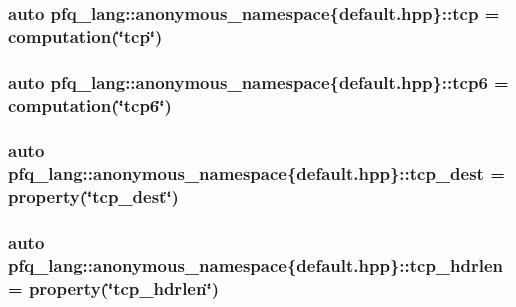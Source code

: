 \hypertarget{namespacepfq__lang_1_1anonymous__namespace_02default_8hpp_03_a4046140746c0012b4d1ea8d3ef53f084}{
\subsubsection[{tcp}]{\setlength{\rightskip}{0pt plus 5cm}auto pfq\-\_\-lang\-::anonymous\-\_\-namespace\{default.\-hpp\}\-::tcp = {\bf computation}(\char`\"{}tcp\char`\"{})}}\label{namespacepfq__lang_1_1anonymous__namespace_02default_8hpp_03_a4046140746c0012b4d1ea8d3ef53f084}
\hypertarget{namespacepfq__lang_1_1anonymous__namespace_02default_8hpp_03_a734af11014e5ccaef77d6fa39cea0d6b}{
\subsubsection[{tcp6}]{\setlength{\rightskip}{0pt plus 5cm}auto pfq\-\_\-lang\-::anonymous\-\_\-namespace\{default.\-hpp\}\-::tcp6 = {\bf computation}(\char`\"{}tcp6\char`\"{})}}\label{namespacepfq__lang_1_1anonymous__namespace_02default_8hpp_03_a734af11014e5ccaef77d6fa39cea0d6b}
\hypertarget{namespacepfq__lang_1_1anonymous__namespace_02default_8hpp_03_a3123415d88452c599055bf8eaba2211e}{
\subsubsection[{tcp\-\_\-dest}]{\setlength{\rightskip}{0pt plus 5cm}auto pfq\-\_\-lang\-::anonymous\-\_\-namespace\{default.\-hpp\}\-::tcp\-\_\-dest = {\bf property}(\char`\"{}tcp\-\_\-dest\char`\"{})}}\label{namespacepfq__lang_1_1anonymous__namespace_02default_8hpp_03_a3123415d88452c599055bf8eaba2211e}
\hypertarget{namespacepfq__lang_1_1anonymous__namespace_02default_8hpp_03_aa8e6b2154ad12220fd1f348c37eaa621}{
\subsubsection[{tcp\-\_\-hdrlen}]{\setlength{\rightskip}{0pt plus 5cm}auto pfq\-\_\-lang\-::anonymous\-\_\-namespace\{default.\-hpp\}\-::tcp\-\_\-hdrlen = {\bf property}(\char`\"{}tcp\-\_\-hdrlen\char`\"{})}}\label{namespacepfq__lang_1_1anonymous__namespace_02default_8hpp_03_aa8e6b2154ad12220fd1f348c37eaa621}
